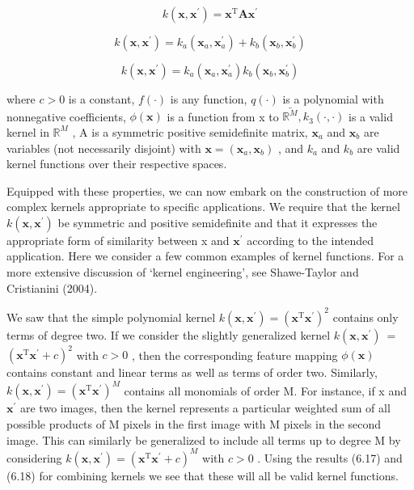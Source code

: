 \documentclass[
  10
]{article}
\begin{document}
\[
k (\mathbf {x}, \mathbf {x} ^ {\prime}) = \mathbf {x} ^ {\mathrm{T}} \mathbf {A} \mathbf {x} ^ {\prime}\tag{6.20}
\]

\[
{k (\mathbf {x}, \mathbf {x} ^ {\prime})} = {k _ {a} (\mathbf {x} _ {a}, \mathbf {x} _ {a} ^ {\prime}) + k _ {b} (\mathbf {x} _ {b}, \mathbf {x} _ {b} ^ {\prime})}\tag{6.21}
\]

\[
{k (\mathbf {x}, \mathbf {x} ^ {\prime})} = {k _ {a} (\mathbf {x} _ {a}, \mathbf {x} _ {a} ^ {\prime}) k _ {b} (\mathbf {x} _ {b}, \mathbf {x} _ {b} ^ {\prime})}\tag{6.22}
\]

where \(c > 0\) is a constant, \(f ( \cdot )\) is any function,
\(q ( \cdot )\) is a polynomial with nonnegative coefficients,
\(\phi ( \mathbf { x } )\) is a function from x to
\(\bar { \mathbb { R } ^ { M } } , k _ { 3 } ( \cdot , \cdot )\) is a
valid kernel in \(\mathbb { R } ^ { M }\) , A is a symmetric positive
semidefinite matrix, \(\mathbf { x } _ { a }\) and
\(\mathbf { x } _ { b }\) are variables (not necessarily disjoint) with
\(\mathbf { x } = ( \mathbf { x } _ { a } , \mathbf { x } _ { b } )\) ,
and \(k _ { a }\) and \(k _ { b }\) are valid kernel functions over
their respective spaces.

Equipped with these properties, we can now embark on the construction of
more complex kernels appropriate to specific applications. We require
that the kernel \(k ( \mathbf { x } , \mathbf { x } ^ { \prime } )\) be
symmetric and positive semidefinite and that it expresses the
appropriate form of similarity between x and
\(\mathbf { x } ^ { \prime }\) according to the intended application.
Here we consider a few common examples of kernel functions. For a more
extensive discussion of `kernel engineering', see Shawe-Taylor and
Cristianini (2004).

We saw that the simple polynomial kernel
\(k ( \mathbf { x } , \mathbf { x } ^ { \prime } ) = \left( \mathbf { x } ^ { \mathrm { { T } } } \mathbf { x } ^ { \prime } \right) ^ { 2 }\)
contains only terms of degree two. If we consider the slightly
generalized kernel
\(k ( \mathbf { x } , \mathbf { x } ^ { \prime } ) ~ =\)
\(\left( \mathbf { x } ^ { \mathrm { { T } } } \mathbf { x } ^ { \prime } + c \right) ^ { 2 }\)
with \(c > 0\) , then the corresponding feature mapping
\(\phi ( \mathbf { x } )\) contains constant and linear terms as well as
terms of order two. Similarly,
\(k ( \mathbf { x } , \mathbf { x } ^ { \prime } ) = \left( \mathbf { x } ^ { \mathrm { { T } } } \mathbf { x } ^ { \prime } \right) ^ { M }\)
contains all monomials of order M. For instance, if x and
\(\mathbf { x } ^ { \prime }\) are two images, then the kernel
represents a particular weighted sum of all possible products of M
pixels in the first image with M pixels in the second image. This can
similarly be generalized to include all terms up to degree M by
considering
\(k ( \mathbf { x } , \mathbf { x } ^ { \prime } ) = \left( \mathbf { x } ^ { \mathrm { { T } } } \mathbf { x } ^ { \prime } + c \right) ^ { M }\)
with \(c > 0\) . Using the results (6.17) and (6.18) for combining
kernels we see that these will all be valid kernel functions.
\end{document}
